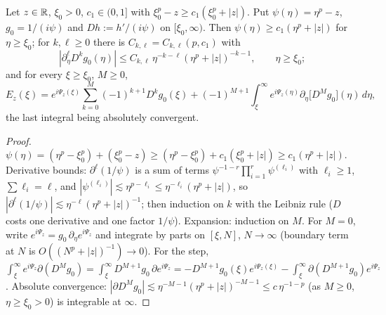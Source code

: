 \begin{lemma}
  \label{lem:c09_tail_expansion}
  Let $z\in\mathbb{R}$, $\xi_0>0$, $c_1\in(0,1]$ with $\xi_0^p-z\ge c_1(\xi_0^p+|z|)$. Put $\psi(\eta)=\eta^p-z$, $g_0=1/(i\psi)$ and $Dh:=h'/(i\psi)$ on $[\xi_0,\infty)$.
  Then $\psi(\eta)\ge c_1(\eta^p+|z|)$ for $\eta\ge\xi_0$; for $k,\ell\ge0$ there is $C_{k,\ell}=C_{k,\ell}(p,c_1)$ with
  \[
    |\partial_\eta^\ell D^kg_0(\eta)|\le C_{k,\ell}\,\eta^{-k-\ell}(\eta^p+|z|)^{-k-1},\qquad\eta\ge\xi_0;
  \]
  and for every $\xi\ge\xi_0$, $M\ge0$,
  \[
    E_z(\xi)=e^{i\Psi_z(\xi)}\sum_{k=0}^M(-1)^{k+1}D^kg_0(\xi)+(-1)^{M+1}\int_\xi^\infty e^{i\Psi_z(\eta)}\partial_\eta\bigl[D^Mg_0\bigr](\eta)\,d\eta,
  \]
  the last integral being absolutely convergent.
\end{lemma}
\begin{proof}
  $\psi(\eta)=(\eta^p-\xi_0^p)+(\xi_0^p-z)\ge(\eta^p-\xi_0^p)+c_1(\xi_0^p+|z|)\ge c_1(\eta^p+|z|)$.
  Derivative bounds: $\partial^\ell(1/\psi)$ is a sum of terms $\psi^{-1-r}\prod_{i=1}^r\psi^{(\ell_i)}$ with $\ell_i\ge1$, $\sum\ell_i=\ell$, and
  $|\psi^{(\ell_i)}|\lesssim\eta^{p-\ell_i}\le\eta^{-\ell_i}(\eta^p+|z|)$, so $|\partial^\ell(1/\psi)|\lesssim\eta^{-\ell}(\eta^p+|z|)^{-1}$; then induction on $k$ with the
  Leibniz rule ($D$ costs one derivative and one factor $1/\psi$). Expansion: induction on $M$. For $M=0$, write $e^{i\Psi_z}=g_0\,\partial_\eta e^{i\Psi_z}$ and
  integrate by parts on $[\xi,N]$, $N\to\infty$ (boundary term at $N$ is $O((N^p+|z|)^{-1})\to0$). For the step,
  $\int_\xi^\infty e^{i\Psi_z}\partial(D^Mg_0)=\int_\xi^\infty D^{M+1}g_0\,\partial e^{i\Psi_z}=-D^{M+1}g_0(\xi)e^{i\Psi_z(\xi)}-\int_\xi^\infty\partial(D^{M+1}g_0)e^{i\Psi_z}$.
  Absolute convergence: $|\partial D^Mg_0|\lesssim\eta^{-M-1}(\eta^p+|z|)^{-M-1}\le c\,\eta^{-1-p}$ (as $M\ge0$, $\eta\ge\xi_0>0$) is integrable at $\infty$.
\end{proof}

